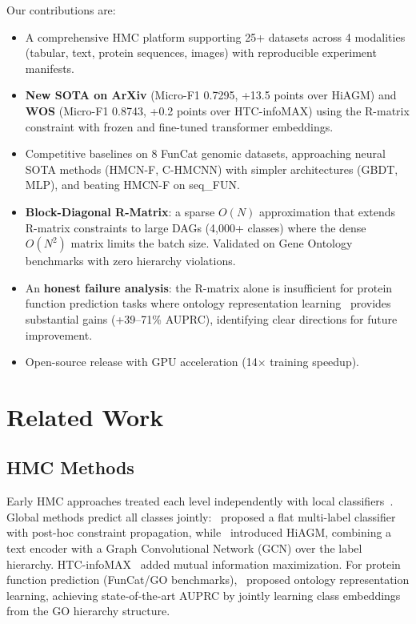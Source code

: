 \documentclass[11pt,a4paper]{article}
\begin{document}
Our contributions are:
\begin{itemize}[leftmargin=*,nosep]
  \item A comprehensive HMC platform supporting 25+ datasets across 4
    modalities (tabular, text, protein sequences, images) with
    reproducible experiment manifests.
  \item \textbf{New SOTA on ArXiv} (Micro-F1 0.7295, +13.5 points
    over HiAGM) and \textbf{WOS} (Micro-F1 0.8743, +0.2 points over
    HTC-infoMAX) using the R-matrix constraint with frozen and
    fine-tuned transformer embeddings.
  \item Competitive baselines on 8 FunCat genomic datasets,
    approaching neural SOTA methods (HMCN-F, C-HMCNN) with simpler
    architectures (GBDT, MLP), and beating HMCN-F on seq\_FUN.
  \item \textbf{Block-Diagonal R-Matrix}: a sparse $O(N)$ approximation
    that extends R-matrix constraints to large DAGs (4,000+ classes)
    where the dense $O(N^2)$ matrix limits the batch size.  Validated on
    Gene Ontology benchmarks with zero hierarchy violations.
  \item An \textbf{honest failure analysis}: the R-matrix alone is
    insufficient for protein function prediction tasks where ontology
    representation learning~\cite{www2022ontology} provides
    substantial gains (+39--71\% AUPRC), identifying clear directions
    for future improvement.
  \item Open-source release with GPU acceleration (14$\times$
    training speedup).
\end{itemize}

\section{Related Work}

\subsection{HMC Methods}

Early HMC approaches treated each level independently with local
classifiers~\cite{silla2011hmc,cerri2014hmc}. Global methods predict
all classes jointly:~\citet{weihs2018hmc} proposed a flat multi-label
classifier with post-hoc constraint propagation, while~\citet{zhou2020hiagm}
introduced HiAGM, combining a text encoder with a Graph Convolutional
Network (GCN) over the label hierarchy. HTC-infoMAX~\cite{htcinfomax}
added mutual information maximization. For protein function prediction
(FunCat/GO benchmarks),~\citet{www2022ontology} proposed ontology
representation learning, achieving state-of-the-art AUPRC by jointly
learning class embeddings from the GO hierarchy structure.
\end{document}
